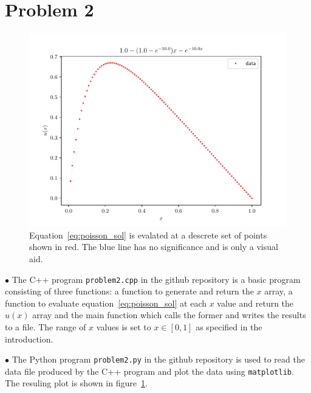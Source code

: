 \documentclass[english,notitlepage]{revtex4-1}  %
\begin{document}
\section*{Problem 2}
\begin{figure}%
    \centering %
    \includegraphics[scale=0.55]{../img/problem2-fig-x-u.pdf} %
    \caption{Equation~\ref{eq:poisson_sol} is evalated 
        at a descrete set of points shown in red. 
        The blue line has no significance and is only a visual aid.}
    \label{fig:problem2-fig-x-u}
\end{figure}
\begin{list}{}{}
    \item[$\bullet$] The C++ program \texttt{problem2.cpp} 
        in the github repository is a basic
        program consisting of three functions: a function 
        to generate and return
        the $x$ array, a function to evaluate 
        equation~\ref{eq:poisson_sol} at each 
        $x$ value and return 
        the $u(x)$ array and the main function which 
        calls the former and writes the results to a file.
        The range of $x$ values is set to $x \in [0,1]$ as
        specified in the introduction.
    \item[$\bullet$] The Python program \texttt{problem2.py} 
        in the github repository is used
          to read the data file produced by the C++ 
          program and plot the data using \texttt{matplotlib}.
          The resuling plot is shown in figure~\ref{fig:problem2-fig-x-u}.  
\end{list}
\end{document}
